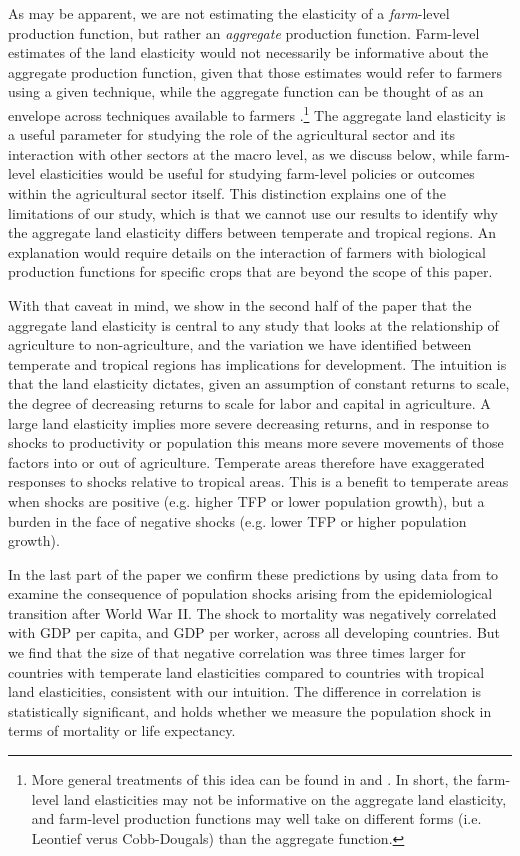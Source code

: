 \documentclass[11pt]{article}
\begin{document}
As may be apparent, we are not estimating the elasticity of a \textit{farm}-level production function, but rather an \textit{aggregate} production function. Farm-level estimates of the land elasticity would not necessarily be informative about the aggregate production function, given that those estimates would refer to farmers using a given technique, while the aggregate function can be thought of as an envelope across techniques available to farmers \citep{Hayami:1970ly}.\footnote{More general treatments of this idea can be found in \citet{houthakker1955} and \citet{jones2005}. In short, the farm-level land elasticities may not be informative on the aggregate land elasticity, and farm-level production functions may well take on different forms (i.e. Leontief verus Cobb-Dougals) than the aggregate function.} The aggregate land elasticity is a useful parameter for studying the role of the agricultural sector and its interaction with other sectors at the macro level, as we discuss below, while farm-level elasticities would be useful for studying farm-level policies or outcomes within the agricultural sector itself. This distinction explains one of the limitations of our study, which is that we cannot use our results to identify why the aggregate land elasticity differs between temperate and tropical regions. An explanation would require details on the interaction of farmers with biological production functions for specific crops that are beyond the scope of this paper. 

With that caveat in mind, we show in the second half of the paper that the aggregate land elasticity is central to any study that looks at the relationship of agriculture to non-agriculture, and the variation we have identified between temperate and tropical regions has implications for development. The intuition is that the land elasticity dictates, given an assumption of constant returns to scale, the degree of decreasing returns to scale for labor and capital in agriculture. A large land elasticity implies more severe decreasing returns, and in response to shocks to productivity or population this means more severe movements of those factors into or out of agriculture. Temperate areas therefore have exaggerated responses to shocks relative to tropical areas. This is a benefit to temperate areas when shocks are positive (e.g. higher TFP or lower population growth), but a burden in the face of negative shocks (e.g. lower TFP or higher population growth).

In the last part of the paper we confirm these predictions by using data from \cite{aj07} to examine the consequence of population shocks arising from the epidemiological transition after World War II. The shock to mortality was negatively correlated with GDP per capita, and GDP per worker, across all developing countries. But we find that the size of that negative correlation was three times larger for countries with temperate land elasticities compared to countries with tropical land elasticities, consistent with our intuition. The difference in correlation is statistically significant, and holds whether we measure the population shock in terms of mortality or life expectancy.
\end{document}
